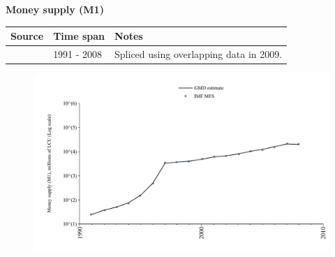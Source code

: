 \documentclass[12pt,a4paper,landscape]{article}
\begin{document}
\begin{adjustbox}{max totalsize={\paperwidth}{\paperheight},center}
\begin{minipage}[t][\textheight][t]{\textwidth}
\vspace*{0.5cm}
{}
\begin{center}
{\Large\bfseries Money supply (M1)}
\end{center}
\vspace{0.5cm}
\begin{table}[H]
\centering
\small
\begin{tabular}{|l|l|l|}
\hline
\textbf{Source} & \textbf{Time span} & \textbf{Notes} \\
\hline
\rowcolor{white}\cite{IMF_MFS}& 1991 - 2008 &Spliced using overlapping data in 2009. \\
\hline
\end{tabular}
\end{table}
\begin{figure}[H]
\centering
\includegraphics[width=\textwidth,height=0.6\textheight,keepaspectratio]{graphs/BGR_M1.pdf}
\end{figure}
\end{minipage}
\end{adjustbox}
\end{document}
